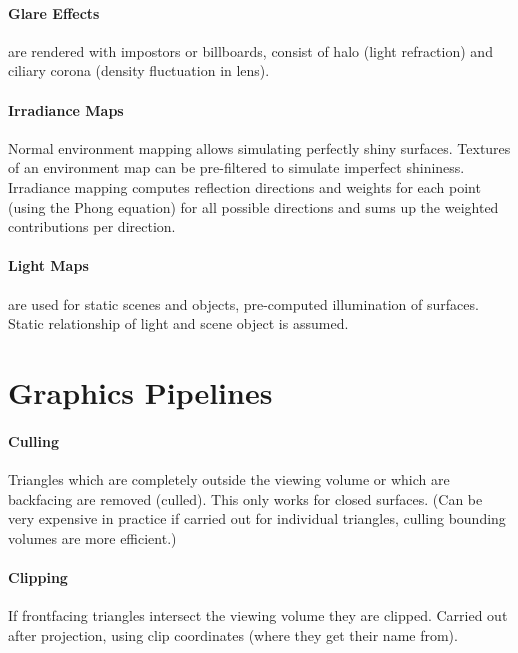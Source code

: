 \documentclass{article}
\begin{document}
\paragraph{Glare Effects} are rendered with impostors or billboards, consist of halo (light refraction) and ciliary corona (density fluctuation in lens).

\paragraph{Irradiance Maps} Normal environment mapping allows simulating perfectly shiny surfaces. Textures of an environment map can be pre-filtered to simulate imperfect shininess. Irradiance mapping computes reflection directions and weights for each point (using the Phong equation) for all possible directions and sums up the weighted contributions per direction.

\paragraph{Light Maps} are used for static scenes and objects, pre-computed illumination of surfaces. Static relationship of light and scene object is assumed.

\section{Graphics Pipelines} 

\paragraph{Culling} Triangles which are completely outside the viewing volume or which are backfacing are removed (culled). This only works for closed surfaces. (Can be very expensive in practice if carried out for individual triangles, culling bounding volumes are more efficient.)

\paragraph{Clipping} If frontfacing triangles intersect the viewing volume they are clipped. Carried out after projection, using clip coordinates (where they get their name from).
\end{document}
